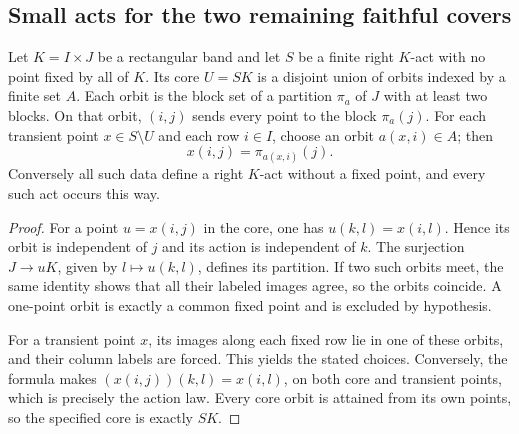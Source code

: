 \subsection{Small acts for the two remaining faithful covers}

\begin{lemma}
\label{CP2:A-small-rectangular-band-acts-by-partitions}
Let $K=I\times J$ be a rectangular band and let $S$ be a
finite right $K$-act with no point fixed by all of $K$.
Its core $U=SK$ is a disjoint union of orbits indexed by a
finite set $A$.  Each orbit is the block set of a partition
$\pi_a$ of $J$ with at least two blocks.  On that orbit,
$(i,j)$ sends every point to the block $\pi_a(j)$.
For each transient point $x\in S\setminus U$ and each
row $i\in I$, choose an orbit $a(x,i)\in A$; then
\[
                  x(i,j)=\pi_{a(x,i)}(j).
\]
Conversely all such data define a right $K$-act without a
fixed point, and every such act occurs this way.
\end{lemma}
\begin{proof}
For a point $u=x(i,j)$ in the core, one has
$u(k,l)=x(i,l)$.  Hence its orbit is independent of $j$
and its action is independent of $k$.  The surjection
$J\to uK$, given by $l\mapsto u(k,l)$, defines its
partition.  If two such orbits meet, the same identity
shows that all their labeled images agree, so the orbits
coincide.  A one-point orbit is exactly a common fixed
point and is excluded by hypothesis.

For a transient point $x$, its images along each fixed
row lie in one of these orbits, and their column labels
are forced.  This yields the stated choices.  Conversely,
the formula makes $(x(i,j))(k,l)=x(i,l)$, on both core
and transient points, which is precisely the action
law.  Every core orbit is attained from its own points,
so the specified core is exactly $SK$.
\end{proof}

